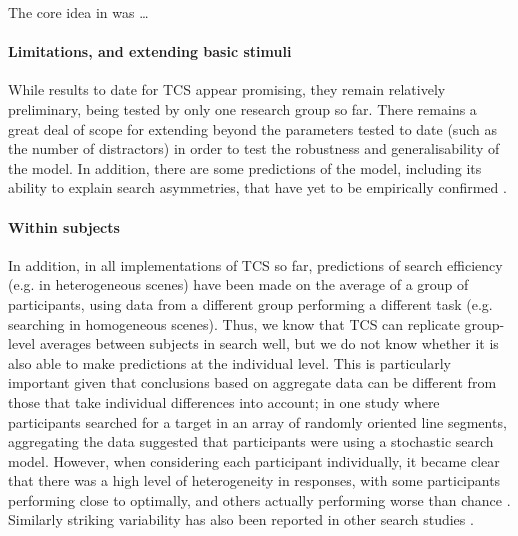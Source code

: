 \documentclass[smallextended, natbib]{svjour3}       %
\begin{document}
The core idea in \cite{buetti2019predicting} was \ldots

\paragraph{Limitations, and extending basic stimuli} While results to date for TCS appear promising, they remain relatively preliminary, being tested by only one research group so far. There remains a great deal of scope for extending beyond the parameters tested to date (such as the number of distractors) in order to test the robustness and generalisability of the model. In addition, there are some predictions of the model, including its ability to explain search asymmetries, that have yet to be empirically confirmed \cite{lleras2020target}.

\paragraph{Within subjects}
In addition, in all implementations of TCS so far, predictions of search efficiency (e.g. in heterogeneous scenes) have been made on the average of a group of participants, using data from a different group performing a different task (e.g. searching in homogeneous scenes). Thus, we know that TCS can replicate group-level averages between subjects in search well, but we do not know whether it is also able to make predictions at the individual level. This is particularly important given that conclusions based on aggregate data can be different from those that take individual differences into account; in one study where participants searched for a target in an array of randomly oriented line segments, aggregating the data suggested that participants were using a stochastic search model. However, when considering each participant individually, it became clear that there was a high level of heterogeneity in responses, with some participants performing close to optimally, and others actually performing worse than chance \cite{nowakowska2017human}. Similarly striking variability has also been reported in other search studies \cite{irons2016choosing, irons2018characterizing}. 
\end{document}
